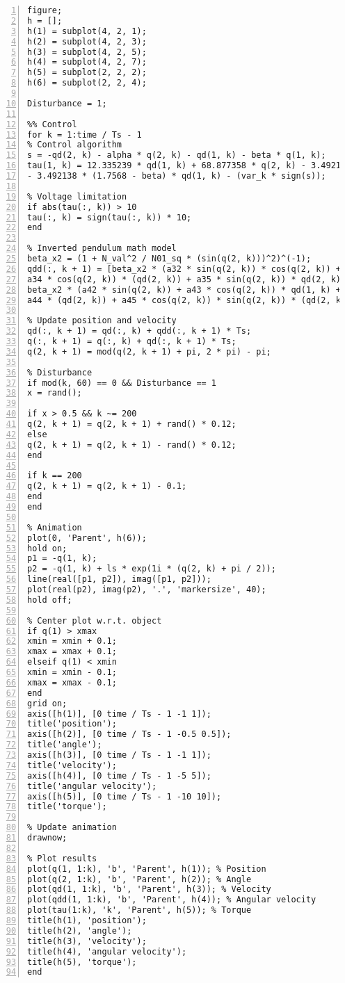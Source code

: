 \begin{lstlisting}[numbers=left,basicstyle=\scriptsize,caption={Source code of sliding mode controller (Simulation).},captionpos=b]
% Create subplots for animation
figure;
h = [];
h(1) = subplot(4, 2, 1);
h(2) = subplot(4, 2, 3);
h(3) = subplot(4, 2, 5);
h(4) = subplot(4, 2, 7);
h(5) = subplot(2, 2, 2);
h(6) = subplot(2, 2, 4);

Disturbance = 1;

%% Control
for k = 1:time / Ts - 1
% Control algorithm
s = -qd(2, k) - alpha * q(2, k) - qd(1, k) - beta * q(1, k);
tau(1, k) = 12.335239 * qd(1, k) + 68.877358 * q(2, k) - 3.492138 * (0.125 - alpha) * qd(2, k)...
- 3.492138 * (1.7568 - beta) * qd(1, k) - (var_k * sign(s));

% Voltage limitation
if abs(tau(:, k)) > 10
tau(:, k) = sign(tau(:, k)) * 10;
end

% Inverted pendulum math model
beta_x2 = (1 + N_val^2 / N01_sq * (sin(q(2, k)))^2)^(-1);
qdd(:, k + 1) = [beta_x2 * (a32 * sin(q(2, k)) * cos(q(2, k)) + a33 * qd(1, k) + ...
a34 * cos(q(2, k)) * (qd(2, k)) + a35 * sin(q(2, k)) * qd(2, k)^2 + b3 * tau(:, k));
beta_x2 * (a42 * sin(q(2, k)) + a43 * cos(q(2, k)) * qd(1, k) + ...
a44 * (qd(2, k)) + a45 * cos(q(2, k)) * sin(q(2, k)) * (qd(2, k))^2 + b4 * cos(q(2, k)) * tau(:, k))];

% Update position and velocity
qd(:, k + 1) = qd(:, k) + qdd(:, k + 1) * Ts;
q(:, k + 1) = q(:, k) + qd(:, k + 1) * Ts;
q(2, k + 1) = mod(q(2, k + 1) + pi, 2 * pi) - pi;

% Disturbance
if mod(k, 60) == 0 && Disturbance == 1
x = rand();

if x > 0.5 && k ~= 200
q(2, k + 1) = q(2, k + 1) + rand() * 0.12;
else
q(2, k + 1) = q(2, k + 1) - rand() * 0.12;
end

if k == 200
q(2, k + 1) = q(2, k + 1) - 0.1;
end
end

% Animation
plot(0, 'Parent', h(6));
hold on;
p1 = -q(1, k);
p2 = -q(1, k) + ls * exp(1i * (q(2, k) + pi / 2));
line(real([p1, p2]), imag([p1, p2]));
plot(real(p2), imag(p2), '.', 'markersize', 40);
hold off;

% Center plot w.r.t. object
if q(1) > xmax
xmin = xmin + 0.1;
xmax = xmax + 0.1;
elseif q(1) < xmin
xmin = xmin - 0.1;
xmax = xmax - 0.1;
end
grid on;
axis([h(1)], [0 time / Ts - 1 -1 1]);
title('position');
axis([h(2)], [0 time / Ts - 1 -0.5 0.5]);
title('angle');
axis([h(3)], [0 time / Ts - 1 -1 1]);
title('velocity');
axis([h(4)], [0 time / Ts - 1 -5 5]);
title('angular velocity');
axis([h(5)], [0 time / Ts - 1 -10 10]);
title('torque');

% Update animation
drawnow;

% Plot results
plot(q(1, 1:k), 'b', 'Parent', h(1)); % Position
plot(q(2, 1:k), 'b', 'Parent', h(2)); % Angle
plot(qd(1, 1:k), 'b', 'Parent', h(3)); % Velocity
plot(qdd(1, 1:k), 'b', 'Parent', h(4)); % Angular velocity
plot(tau(1:k), 'k', 'Parent', h(5)); % Torque
title(h(1), 'position');
title(h(2), 'angle');
title(h(3), 'velocity');
title(h(4), 'angular velocity');
title(h(5), 'torque');
end
\end{lstlisting}